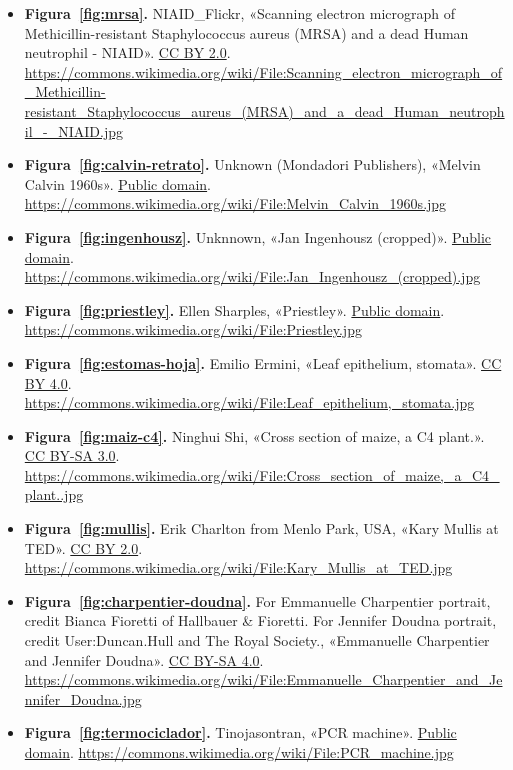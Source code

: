 \documentclass{book}
\begin{document}
\begin{itemize}
\item \textbf{Figura~\ref{fig:mrsa}.} NIAID\_Flickr, «Scanning electron micrograph of Methicillin-resistant Staphylococcus aureus (MRSA) and a dead Human neutrophil - NIAID». \href{https://creativecommons.org/licenses/by/2.0/}{CC BY 2.0}. \url{https://commons.wikimedia.org/wiki/File:Scanning_electron_micrograph_of_Methicillin-resistant_Staphylococcus_aureus_(MRSA)_and_a_dead_Human_neutrophil_-_NIAID.jpg}
\item \textbf{Figura~\ref{fig:calvin-retrato}.} Unknown (Mondadori Publishers), «Melvin Calvin 1960s». \href{https://creativecommons.org/publicdomain/mark/1.0/}{Public domain}. \url{https://commons.wikimedia.org/wiki/File:Melvin_Calvin_1960s.jpg}
\item \textbf{Figura~\ref{fig:ingenhousz}.} Unknnown, «Jan Ingenhousz (cropped)». \href{https://creativecommons.org/publicdomain/mark/1.0/}{Public domain}. \url{https://commons.wikimedia.org/wiki/File:Jan_Ingenhousz_(cropped).jpg}
\item \textbf{Figura~\ref{fig:priestley}.} Ellen Sharples, «Priestley». \href{https://creativecommons.org/publicdomain/mark/1.0/}{Public domain}. \url{https://commons.wikimedia.org/wiki/File:Priestley.jpg}
\item \textbf{Figura~\ref{fig:estomas-hoja}.} Emilio Ermini, «Leaf epithelium, stomata». \href{https://creativecommons.org/licenses/by/4.0/}{CC BY 4.0}. \url{https://commons.wikimedia.org/wiki/File:Leaf_epithelium,_stomata.jpg}
\item \textbf{Figura~\ref{fig:maiz-c4}.} Ninghui Shi, «Cross section of maize, a C4 plant.». \href{https://creativecommons.org/licenses/by-sa/3.0/}{CC BY-SA 3.0}. \url{https://commons.wikimedia.org/wiki/File:Cross_section_of_maize,_a_C4_plant..jpg}
\item \textbf{Figura~\ref{fig:mullis}.} Erik Charlton from Menlo Park, USA, «Kary Mullis at TED». \href{https://creativecommons.org/licenses/by/2.0/}{CC BY 2.0}. \url{https://commons.wikimedia.org/wiki/File:Kary_Mullis_at_TED.jpg}
\item \textbf{Figura~\ref{fig:charpentier-doudna}.} For Emmanuelle Charpentier portrait, credit Bianca Fioretti of Hallbauer \& Fioretti. For Jennifer Doudna portrait, credit User:Duncan.Hull and The Royal Society., «Emmanuelle Charpentier and Jennifer Doudna». \href{https://creativecommons.org/licenses/by-sa/4.0/}{CC BY-SA 4.0}. \url{https://commons.wikimedia.org/wiki/File:Emmanuelle_Charpentier_and_Jennifer_Doudna.jpg}
\item \textbf{Figura~\ref{fig:termociclador}.} Tinojasontran, «PCR machine». \href{https://creativecommons.org/publicdomain/mark/1.0/}{Public domain}. \url{https://commons.wikimedia.org/wiki/File:PCR_machine.jpg}

\end{itemize}
\end{document}

